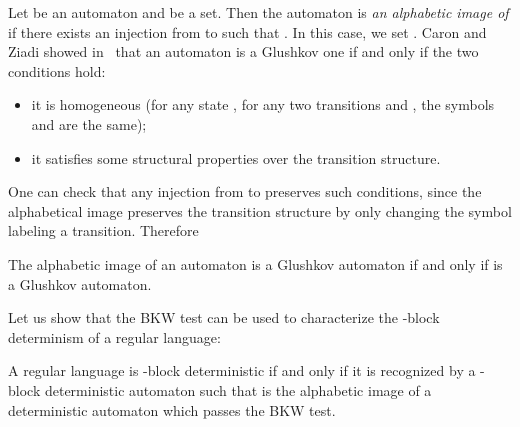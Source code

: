 \documentclass{llncs}
\begin{document}
	Let  be an automaton and  be a set. Then the automaton  is \emph{an alphabetic image of}  if there exists an injection  from  to  such that . In this case, we set .	
Caron and Ziadi showed in~\cite{CZ97} that an automaton is a Glushkov one if and only if the two conditions hold:
\begin{itemize}
  \item it is homogeneous (for any state , for any two transitions  and , the symbols  and  are the same);
  \item it satisfies some structural properties over the transition structure.
\end{itemize}
One can check that any injection  from  to  preserves such conditions, since
the alphabetical image preserves the transition structure by only changing the symbol labeling a transition.
Therefore 
	\begin{lemma}\label{lm:ImageGlushkov}
	  The alphabetic image of an automaton  is a Glushkov automaton if and only if  is a Glushkov automaton. 
	\end{lemma}	
	Let us show that the BKW test can be used to characterize the -block determinism of a regular language:
\begin{theorem}\label{th:KBD}
	A regular language  is -block deterministic if and only if it is recognized by a -block deterministic automaton  such that  is the alphabetic image of a deterministic automaton which passes the BKW test.
\end{theorem}
\end{document}
